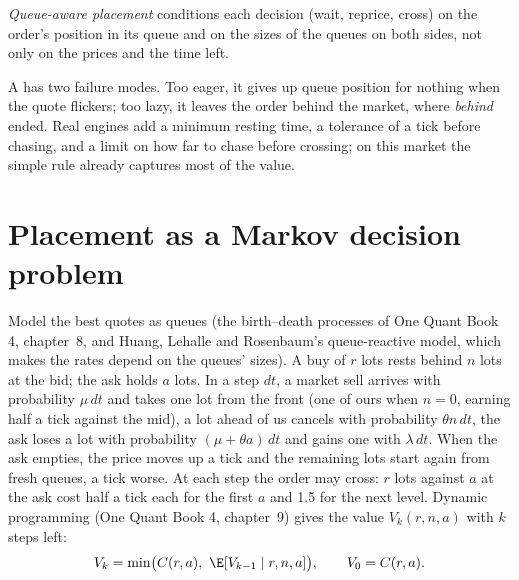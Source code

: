 \begin{definition}\label{def:mx:child-order-placement:qaware}
\emph{Queue-aware placement} conditions each decision (wait, reprice, cross) on the order's position in its queue and on
the sizes of the queues on both sides, not only on the prices and the time left.
\end{definition}

A  has two failure modes. Too eager, it gives up queue position for nothing when the quote flickers; too lazy, it leaves the order behind
the market, where \emph{behind} ended. Real engines add a minimum resting time, a tolerance of a tick before chasing, and a limit on how far to chase
before crossing; on this market the simple rule already captures most of the value.

\section{Placement as a Markov decision problem}

Model the best quotes as queues (the birth--death processes of One Quant Book 4, chapter~8, and Huang, Lehalle and Rosenbaum's queue-reactive
model, which makes the rates depend on the queues' sizes). A buy of $r$ lots rests behind $n$ lots at the bid; the ask holds $a$ lots. In a step
$dt$, a market sell arrives with probability $\mu\,dt$ and takes one lot from the front (one of ours when $n=0$, earning half a tick against the mid),
a lot ahead of us cancels with probability $\theta n\,dt$, the ask loses a lot with probability $(\mu+\theta a)\,dt$ and gains one with $\lambda\,dt$.
When the ask empties, the price moves up a tick and the remaining lots start again from fresh queues, a tick worse. At each step the order may
cross: $r$ lots against $a$ at the ask cost half a tick each for the first $a$ and 1.5 for the next level. Dynamic programming (One Quant Book 4,
chapter~9) gives the value $V_k(r,n,a)$ with $k$ steps left:
\[
V_k=\min\bigl(C(r,a),\ \E[V_{k-1}\mid r,n,a]\bigr),\qquad V_0=C(r,a).
\]

\label{lst:mx:child-order-placement:dp}

